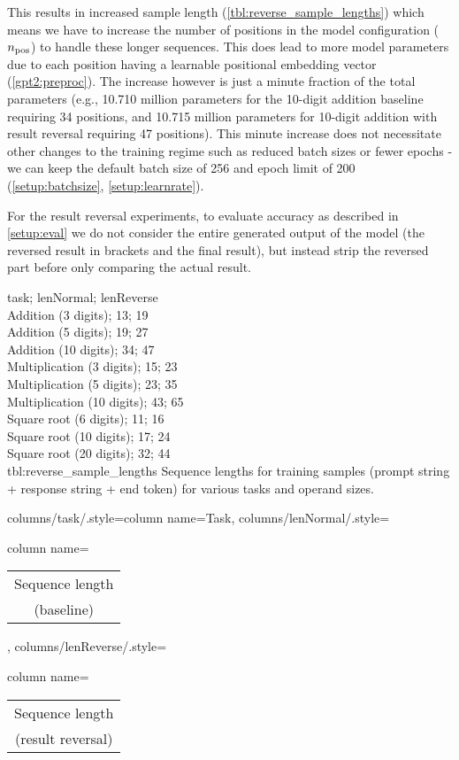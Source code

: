 This results in increased sample length (\cref{tbl:reverse_sample_lengths}) which means we have to increase the number of positions in the model configuration (${n_\textrm{pos}}$) to handle these longer sequences. This does lead to more model parameters due to each position having a learnable positional embedding vector (\cref{gpt2:preproc}). The increase however is just a minute fraction of the total parameters (e.g., 10.710 million parameters for the 10-digit addition baseline requiring 34 positions, and 10.715 million parameters for 10-digit addition with result reversal requiring 47 positions). This minute increase does not necessitate other changes to the training regime such as reduced batch sizes or fewer epochs - we can keep the default batch size of 256 and epoch limit of 200 (\cref{setup:batchsize}, \cref{setup:learnrate}).

For the result reversal experiments, to evaluate accuracy as described in \cref{setup:eval} we do not consider the entire generated output of the model (the reversed result in brackets and the final result), but instead strip the reversed part before only comparing the actual result.

{
	task; lenNormal; lenReverse\\
	Addition (3 digits); 13; 19 \\
	Addition (5 digits); 19; 27 \\
	Addition (10 digits); 34; 47 \\
	Multiplication (3 digits); 15; 23 \\
	Multiplication (5 digits); 23; 35 \\
	Multiplication (10 digits); 43; 65 \\
	Square root (6 digits); 11; 16 \\
	Square root (10 digits); 17; 24 \\
	Square root (20 digits); 32; 44 \\
}
{tbl:reverse_sample_lengths}
{
	Sequence lengths for training samples (prompt string + response string + end token) for various tasks and operand sizes.
}
{%
	columns/task/.style={column name={Task}},
	columns/lenNormal/.style={column name={\begin{tabular}{c} Sequence length \\ (baseline) \\ \end{tabular}}},
	columns/lenReverse/.style={column name={\begin{tabular}{c} Sequence length \\ (result reversal) \\ \end{tabular}}}
}



